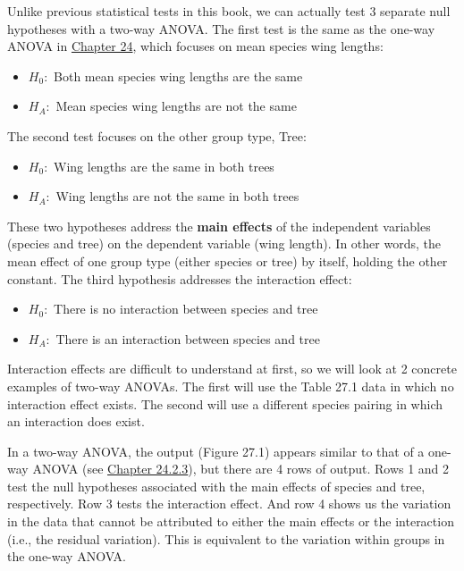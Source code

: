 \documentclass[
  openany]{scrbook}
\providecommand{\tightlist}{%
  \setlength{\itemsep}{0pt}\setlength{\parskip}{0pt}}
\begin{document}
Unlike previous statistical tests in this book, we can actually test 3 separate null hypotheses with a two-way ANOVA.
The first test is the same as the one-way ANOVA in \protect\hyperlink{Chapter_24}{Chapter 24}, which focuses on mean species wing lengths:

\begin{itemize}
\tightlist
\item
  \(H_{0}:\) Both mean species wing lengths are the same
\item
  \(H_{A}:\) Mean species wing lengths are not the same
\end{itemize}

The second test focuses on the other group type, Tree:

\begin{itemize}
\tightlist
\item
  \(H_{0}:\) Wing lengths are the same in both trees
\item
  \(H_{A}:\) Wing lengths are not the same in both trees
\end{itemize}

These two hypotheses address the \textbf{main effects} of the independent variables (species and tree) on the dependent variable (wing length).
In other words, the mean effect of one group type (either species or tree) by itself, holding the other constant.
The third hypothesis addresses the interaction effect:

\begin{itemize}
\tightlist
\item
  \(H_{0}:\) There is no interaction between species and tree
\item
  \(H_{A}:\) There is an interaction between species and tree
\end{itemize}

Interaction effects are difficult to understand at first, so we will look at 2 concrete examples of two-way ANOVAs.
The first will use the Table 27.1 data in which no interaction effect exists.
The second will use a different species pairing in which an interaction does exist.

In a two-way ANOVA, the output (Figure 27.1) appears similar to that of a one-way ANOVA (see \protect\hyperlink{anova-f-statistic-calculation}{Chapter 24.2.3}), but there are 4 rows of output.
Rows 1 and 2 test the null hypotheses associated with the main effects of species and tree, respectively.
Row 3 tests the interaction effect.
And row 4 shows us the variation in the data that cannot be attributed to either the main effects or the interaction (i.e., the residual variation).
This is equivalent to the variation within groups in the one-way ANOVA.
\end{document}
